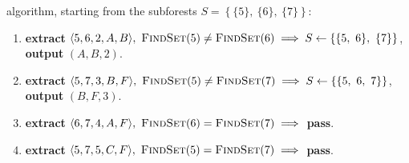 algorithm, starting from the subforests $S = \left\{\{5\},\ \{6\},\ \{7\}\right\}$:
%
\begin{enumerate}
  \item {\bf extract} $\langle 5,6,2,A,B \rangle,\ \text{\sc FindSet}(5) \neq \text{\sc FindSet}(6) \implies S \gets \left\{\{5,\ 6\},\ \{7\}\right\}$, {\bf output} $(A,B,2)$.
  \item {\bf extract} $\langle 5,7,3,B,F \rangle,\ \text{\sc FindSet}(5) \neq \text{\sc FindSet}(7) \implies S \gets \left\{\{5,\ 6,\ 7\}\right\}$, {\bf output} $(B,F,3)$.
  \item {\bf extract} $\langle 6,7,4,A,F \rangle,\ \text{\sc FindSet}(6) = \text{\sc FindSet}(7) \implies $ {\bf pass}.
  \item {\bf extract} $\langle 5,7,5,C,F \rangle,\ \text{\sc FindSet}(5) = \text{\sc FindSet}(7) \implies $ {\bf pass}.
\end{enumerate}
%
